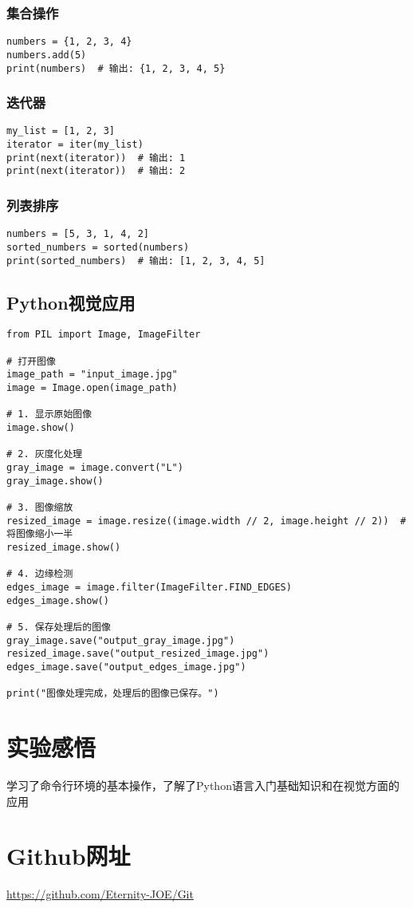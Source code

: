 \documentclass[a4paper, 12pt]{article}
\begin{document}
\subsubsection{集合操作}
\begin{lstlisting}
numbers = {1, 2, 3, 4}
numbers.add(5)
print(numbers)  # 输出: {1, 2, 3, 4, 5}
\end{lstlisting}

\subsubsection{迭代器}
\begin{lstlisting}
my_list = [1, 2, 3]
iterator = iter(my_list)
print(next(iterator))  # 输出: 1
print(next(iterator))  # 输出: 2
\end{lstlisting}

\subsubsection{列表排序}
\begin{lstlisting}
numbers = [5, 3, 1, 4, 2]
sorted_numbers = sorted(numbers)
print(sorted_numbers)  # 输出: [1, 2, 3, 4, 5]
\end{lstlisting}

\subsection{Python视觉应用}
\begin{lstlisting}
from PIL import Image, ImageFilter

# 打开图像
image_path = "input_image.jpg"
image = Image.open(image_path)

# 1. 显示原始图像
image.show()

# 2. 灰度化处理
gray_image = image.convert("L")
gray_image.show()

# 3. 图像缩放
resized_image = image.resize((image.width // 2, image.height // 2))  # 将图像缩小一半
resized_image.show()

# 4. 边缘检测
edges_image = image.filter(ImageFilter.FIND_EDGES)
edges_image.show()

# 5. 保存处理后的图像
gray_image.save("output_gray_image.jpg")
resized_image.save("output_resized_image.jpg")
edges_image.save("output_edges_image.jpg")

print("图像处理完成，处理后的图像已保存。")

\end{lstlisting}


\newpage
\section{实验感悟}
学习了命令行环境的基本操作，了解了Python语言入门基础知识和在视觉方面的应用
\section{Github网址}
\href{https://github.com/Eternity-JOE/Git}{https://github.com/Eternity-JOE/Git}
\end{document}
